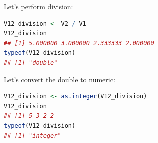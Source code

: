 \documentclass[10pt]{book}
\begin{document}
Let’s perform division:
\begin{lstlisting}[language=R]
V12_division <- V2 / V1
V12_division
## [1] 5.000000 3.000000 2.333333 2.000000
typeof(V12_division)
## [1] "double"
\end{lstlisting}

Let’s convert the double to numeric:
\begin{lstlisting}[language=R]
V12_division <- as.integer(V12_division)
V12_division
## [1] 5 3 2 2
typeof(V12_division)
## [1] "integer"
\end{lstlisting}







%
%
%
%
%
%
%
%
%
%
\end{document}
